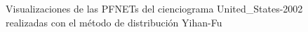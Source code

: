 \documentclass[10pt,a4paper,spanish]{article}
\numberwithin{equation}{section} %
\numberwithin{figure}{section} %
\numberwithin{table}{section} %
\begin{document}
\begin{figure}[!h]
{{            \label{q4yhus}
        }
    }
    \caption{Visualizaciones de las PFNETs del cienciograma United\_States-2002 realizadas con el método de distribución Yihan-Fu}
    \label{yhus}
\end{figure}
\end{document}

